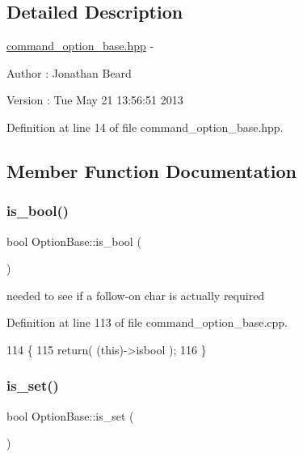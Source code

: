 \subsection{Detailed Description}
\hyperlink{command__option__base_8hpp_source}{command\+\_\+option\+\_\+base.\+hpp} -\/ \begin{DoxyAuthor}{Author}
\+: Jonathan Beard 
\end{DoxyAuthor}
\begin{DoxyVersion}{Version}
\+: Tue May 21 13\+:56\+:51 2013 
\end{DoxyVersion}


Definition at line 14 of file command\+\_\+option\+\_\+base.\+hpp.



\subsection{Member Function Documentation}
\hypertarget{class_option_base_a082825b91ec72a250b6c04a4d65ec1ec}{}\label{class_option_base_a082825b91ec72a250b6c04a4d65ec1ec} 
\subsubsection{\texorpdfstring{is\+\_\+bool()}{is\_bool()}}
{\footnotesize\ttfamily bool Option\+Base\+::is\+\_\+bool (\begin{DoxyParamCaption}{ }\end{DoxyParamCaption})}

needed to see if a follow-\/on char is actually required 

Definition at line 113 of file command\+\_\+option\+\_\+base.\+cpp.


\begin{DoxyCode}
114 \{
115    \textcolor{keywordflow}{return}( (\textcolor{keyword}{this})->isbool );
116 \}
\end{DoxyCode}
\hypertarget{class_option_base_a9cbf7eb440a51dde21dadba4d4844c6d}{}\label{class_option_base_a9cbf7eb440a51dde21dadba4d4844c6d} 
\subsubsection{\texorpdfstring{is\+\_\+set()}{is\_set()}}
{\footnotesize\ttfamily bool Option\+Base\+::is\+\_\+set (\begin{DoxyParamCaption}{ }\end{DoxyParamCaption})}


